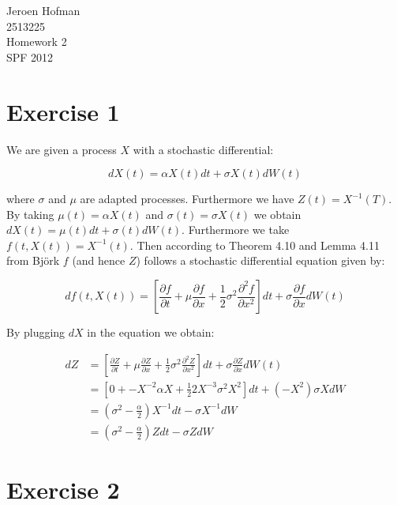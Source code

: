 \documentclass[11pt,a4paper,onecolumn]{article}
\begin{document}
\captionsetup{width=0.8\textwidth}
\thispagestyle{empty}

{\Huge Jeroen Hofman \\}
{\Large 2513225 \\
Homework 2 \\
SPF 2012}

\section{Exercise 1}

We are given a process $X$ with a stochastic differential:

\begin{equation}
  dX(t) = \alpha X(t)dt + \sigma X(t)dW(t)
\end{equation}

where $\sigma$ and $\mu$ are adapted processes. Furthermore we have $Z(t) = X^{-1}(T)$. By taking $\mu(t) = \alpha X(t)$ and $\sigma(t) = \sigma X(t)$ we obtain $dX(t) = \mu(t)dt + \sigma(t)dW(t)$. Furthermore we take $f(t,X(t)) = X^{-1}(t)$. Then according to Theorem 4.10 and Lemma 4.11 from Bj\"ork $f$ (and hence $Z$) follows a stochastic differential equation given by:

\begin{equation}
  df(t,X(t)) = \left[ \frac{\partial f}{\partial t} + \mu \frac{\partial f}{\partial x} + \frac{1}{2}\sigma^2\frac{\partial^2f}{\partial x^2}\right]dt + \sigma\frac{\partial f}{\partial x}dW(t)
\end{equation}

By plugging $dX$ in the equation we obtain:

\begin{align}
  dZ &= \left[ \frac{\partial Z}{\partial t} + \mu \frac{\partial Z}{\partial x} + \frac{1}{2}\sigma^2\frac{\partial^2Z}{\partial x^2}\right]dt + \sigma\frac{\partial Z}{\partial x}dW(t) \\
  &= \left[0 + -X^{-2} \alpha X + \frac{1}{2}2X^{-3}\sigma^2X^2\right]dt + (-X^2)\sigma XdW\\
  &= \left(\sigma^2 -\frac{\alpha}{2}\right)X^{-1}dt - \sigma X^{-1} dW \\
  &= \left(\sigma^2 -\frac{\alpha}{2}\right)Zdt - \sigma Z dW
\end{align}

\section{Exercise 2}
\end{document}
